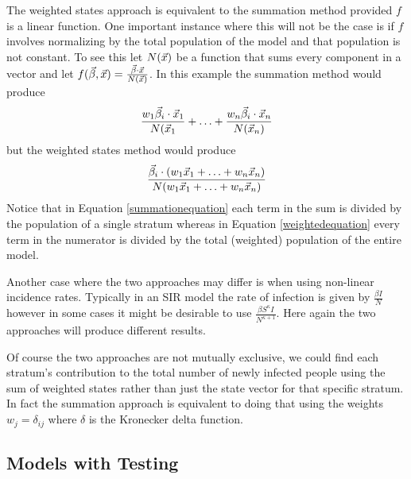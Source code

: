 The weighted states approach is equivalent to the summation method provided $f$ is a linear function. One important instance where this will not be the case is if $f$ involves normalizing by the total population of the model and that population is not constant. To see this let $N(\vec{x})$ be a function that sums every component in a vector and let $f(\vec{\beta}, \vec{x}) = \frac{\vec{\beta} \cdot \vec{x}}{N(\vec{x})}$. In this example the summation method would produce 
\begin{equation}\label{summationequation}
\frac{w_1\vec{\beta}_{i}\cdot \vec{x}_1}{N(\vec{x}_1} + \ldots + \frac{w_n\vec{\beta}_{i}\cdot \vec{x}_n}{N(\vec{x}_n)}
\end{equation}\label{weightedequation}
but the weighted states method would produce
\begin{equation}
    \frac{\vec{\beta}_i \cdot (w_1\vec{x}_1+\ldots + w_n\vec{x}_n)}{N(w_1\vec{x}_1+\ldots + w_n\vec{x}_n)}
\end{equation}
Notice that in Equation \ref{summationequation} each term in the sum is divided by the population of a single stratum whereas in Equation \ref{weightedequation} every term in the numerator is divided by the total (weighted) population of the entire model. 

Another case where the two approaches may differ is when using non-linear incidence rates. Typically in an SIR model the \pc rate of infection is given by $\frac{\beta I}{N}$ however in some cases it might be desirable to use $\frac{\beta S^\kappa I}{N^{\kappa +1}}$. Here again the two approaches will produce different results. 

Of course the two approaches are not mutually exclusive, we could find each stratum's contribution to the total number of newly infected people using the sum of weighted states rather than just the state vector for that specific stratum. In fact the summation approach is equivalent to doing that using the weights $w_j = \delta_{ij}$ where $\delta$ is the Kronecker delta function. 


\subsection{Models with Testing}\label{testing}

